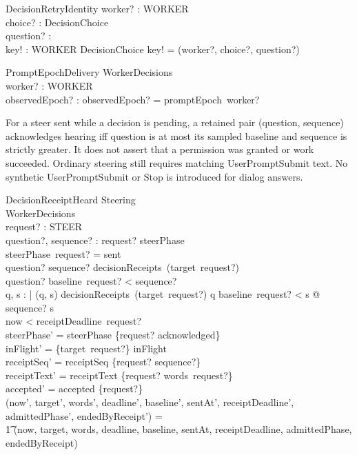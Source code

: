 \documentclass[a4paper,10pt,fleqn]{article}
\begin{document}
\begin{schema}{DecisionRetryIdentity}
  worker? : WORKER \\
  choice? : DecisionChoice \\
  question? : \nat \\
  key! : WORKER \cross DecisionChoice \cross \nat
\where
  key! = (worker?, choice?, question?)
\end{schema}

\begin{schema}{PromptEpochDelivery}
  \Xi WorkerDecisions \\
  worker? : WORKER \\
  observedEpoch? : \nat
\where
  observedEpoch? = promptEpoch~worker?
\end{schema}

For a steer sent
while a decision is pending, a retained pair (question, sequence) acknowledges
hearing iff question is at most its sampled baseline and sequence is strictly
greater. It does not assert that a permission was granted or work succeeded.
Ordinary steering still requires matching UserPromptSubmit text. No synthetic
UserPromptSubmit or Stop is introduced for dialog answers.

\begin{schema}{DecisionReceiptHeard}
  \Delta Steering \\
  \Xi WorkerDecisions \\
  request? : STEER \\
  question?, sequence? : \nat
\where
  request? \in \dom steerPhase \\
  steerPhase~request? = sent \\
  question? \mapsto sequence? \in decisionReceipts~(target~request?) \\
  question? \leq baseline~request? < sequence? \\
  \forall q, s : \nat | (q, s) \in decisionReceipts~(target~request?) \land
    q \leq baseline~request? < s @ sequence? \leq s \\
  now < receiptDeadline~request? \\
  steerPhase' = steerPhase \oplus \{request? \mapsto acknowledged\} \\
  inFlight' = \{target~request?\} \ndres inFlight \\
  receiptSeq' = receiptSeq \cup \{request? \mapsto sequence?\} \\
  receiptText' = receiptText \cup \{request? \mapsto words~request?\} \\
  accepted' = accepted \cup \{request?\} \\
  (now', target', words', deadline', baseline', sentAt', receiptDeadline', admittedPhase', endedByReceipt') = \\
  \t1 (now, target, words, deadline, baseline, sentAt, receiptDeadline, admittedPhase, endedByReceipt)
\end{schema}
\end{document}
